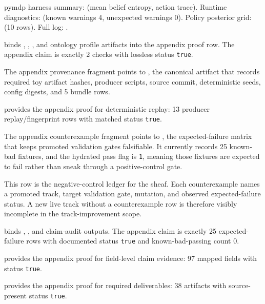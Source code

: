 \documentclass[
  english,
]{article}
\begin{document}
pymdp harness summary: 
(mean belief entropy, action trace). Runtime diagnostics:
 (known warnings
4, unexpected warnings 0). Policy posterior grid:
 (10 rows). Full
log: .

 binds
,
,
, and ontology profile
artifacts into the appendix proof row. The appendix claim is exactly 2
checks with lossless status \texttt{true}.

The appendix provenance fragment points to
, the canonical artifact
that records required toy artifact hashes, producer scripts, source
commit, deterministic seeds, config digests, and 5 bundle rows.

 provides the appendix proof for
deterministic replay: 13 producer replay/fingerprint rows with matched
status \texttt{true}.

The appendix counterexample fragment points to
, the
expected-failure matrix that keeps promoted validation gates
falsifiable. It currently records 25 known-bad fixtures, and the
hydrated pass flag is \texttt{1}, meaning those fixtures are expected to
fail rather than sneak through a positive-control gate.

This row is the negative-control ledger for the sheaf. Each
counterexample names a promoted track, target validation gate, mutation,
and observed expected-failure status. A new live track without a
counterexample row is therefore visibly incomplete in the
track-improvement scope.

 binds
,
, and claim-audit
outputs. The appendix claim is exactly 25 expected-failure rows with
documented status \texttt{true} and known-bad-passing count 0.

 provides the appendix proof for
field-level claim evidence: 97 mapped fields with status \texttt{true}.

 provides the appendix proof for
required deliverables: 38 artifacts with source-present status
\texttt{true}.
\end{document}
